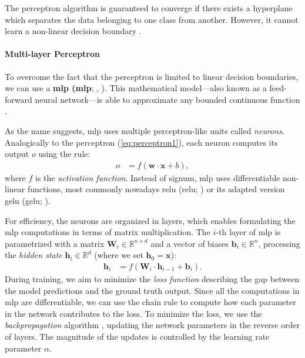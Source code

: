 The perceptron algorithm is guaranteed to converge if there exists a hyperplane which separates the data belonging to one class from another. However, it cannot learn a non-linear decision boundary  \cite{novikoff1962convergence}.

\paragraph{Multi-layer Perceptron} To overcome the fact that the perceptron is limited to linear decision boundaries, we can use a \textbf{\acl{mlp} (\acs{mlp}}; \citealp[p.~227]{bishop2006pattern}, \citealp[p.~73]{surdeanu2024deep}). This mathematical model---also known as a feed-forward neural network---is able to approximate any bounded continuous function \cite{hornik1989multilayer}.

As the name suggests, \ac{mlp} uses multiple perceptron-like units called \textit{neurons}. Analogically to the perceptron (\autoref{eq:perceptron1}), each neuron computes its output $o$ using the rule:
\begin{align}
    o & = f(\mathbf{w} \cdot \mathbf{x} + b),
\end{align}
where $f$ is the \emph{activation function}. Instead of signum, \ac{mlp} uses differentiable non-linear functions, most commonly nowadays \acl{relu} (\acs{relu}; \citealp{nair2010rectified}) or its adapted version \acl{gelu} (\acs{gelu}; \citealp{hendrycks2016gaussian}).

For efficiency, the neurons are organized in layers, which enables formulating the \ac{mlp} computations in terms of matrix multiplication. The $i$-th layer of \ac{mlp} is parametrized with a matrix $\mathbf{W}_i \in \mathbb{R}^{n\times d}$ and a vector of biases $\mathbf{b}_i \in \mathbb{R}^{n}$, processing the \textit{hidden state} $\mathbf{h}_i \in \mathbb{R}^{d}$ (where we set $\textbf{h}_0 = \textbf{x}$):
\begin{align}
    \mathbf{h}_i & = f(\mathbf{W}_i \cdot \mathbf{h}_{i-1} + \mathbf{b}_i).
\end{align}
During training, we aim to minimize the \textit{loss function} describing the gap between the model predictions and the ground truth output. Since all the computations in \ac{mlp} are differentiable, we can use the chain rule to compute how each parameter in the network contributes to the loss. To minimize the loss, we use the \emph{backpropagation} algorithm \cite{kelley1960gradient,rumelhart1986learning}, updating the network parameters in the reverse order of layers. The magnitude of the updates is controlled by the learning rate parameter $\alpha$.

